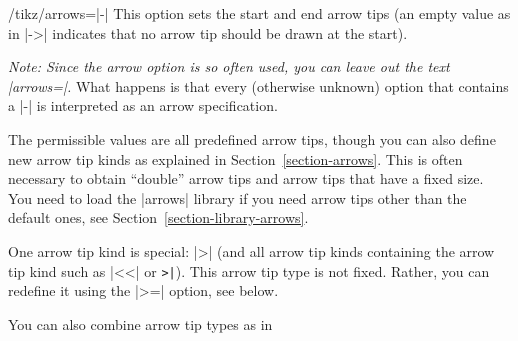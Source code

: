 \begin{key}{/tikz/arrows=|-|}
  This option sets the start and end arrow tips (an empty value as in |->|
  indicates that no arrow tip should be drawn at the start).%

  \emph{Note: Since the arrow option is so often used, you can leave
    out the text |arrows=|.} What happens is that every (otherwise
  unknown) option that contains a |-| is interpreted as an arrow specification.

\begin{codeexample}[]
\end{codeexample}

  The permissible values are all predefined arrow tips, though
  you can also define new arrow tip kinds as explained in
  Section~\ref{section-arrows}. This is often necessary to obtain
  ``double'' arrow tips and arrow tips that have a fixed size. You
  need to load the |arrows| library if you need arrow tips other than
  the default ones, see Section~\ref{section-library-arrows}.

  One arrow tip kind is special: |>| (and all arrow tip kinds containing the
  arrow tip kind such as |<<| or \verb!>|!). This arrow tip type is not
  fixed. Rather, you can redefine it using the |>=| option, see
  below.

  \example You can also combine arrow tip types as in
\begin{codeexample}[]
\begin{tikzpicture}[thick]
  \draw[to reversed-to]   (0,0) .. controls +(.5,0) and +(-.5,-.5) .. +(1.5,1);
  \draw[[-latex reversed] (1,0) .. controls +(.5,0) and +(-.5,-.5) .. +(1.5,1);
  \draw[latex-)]          (2,0) .. controls +(.5,0) and +(-.5,-.5) .. +(1.5,1);
  \useasboundingbox (-.1,-.1) rectangle (3.1,1.1); %
\end{tikzpicture}
\end{codeexample}
\end{key}

